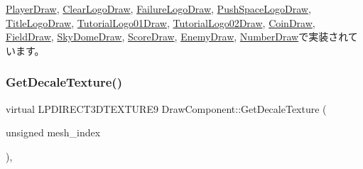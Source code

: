 \mbox{\hyperlink{class_player_draw_a1d58f14658bf5e058f67c6754d9898e7}{Player\+Draw}}, \mbox{\hyperlink{class_clear_logo_draw_ad3501ec3720bf2f2878de2785432eee7}{Clear\+Logo\+Draw}}, \mbox{\hyperlink{class_failure_logo_draw_a9e594c09e4da69134e9f7384cc5f8392}{Failure\+Logo\+Draw}}, \mbox{\hyperlink{class_push_space_logo_draw_a4d0e48e3770a3906bd7d0a607e36a5b5}{Push\+Space\+Logo\+Draw}}, \mbox{\hyperlink{class_title_logo_draw_a06917439520efba7319f254566f19b81}{Title\+Logo\+Draw}}, \mbox{\hyperlink{class_tutorial_logo01_draw_a92e3c7b5fb5e068615418299c0ab2b8b}{Tutorial\+Logo01\+Draw}}, \mbox{\hyperlink{class_tutorial_logo02_draw_a616cd2a60e7bc628bfa7845f4cefaa0a}{Tutorial\+Logo02\+Draw}}, \mbox{\hyperlink{class_coin_draw_a57e3f327324db9ec3debc702d14325c7}{Coin\+Draw}}, \mbox{\hyperlink{class_field_draw_a78b6bc16f825e91c39fad97931ea63fd}{Field\+Draw}}, \mbox{\hyperlink{class_sky_dome_draw_a89a1d08932cb19b43ebe42481944b6cc}{Sky\+Dome\+Draw}}, \mbox{\hyperlink{class_score_draw_a0744dd3db298a45683b7521a02e8e9db}{Score\+Draw}}, \mbox{\hyperlink{class_enemy_draw_a4d922df05a3a3f4117399817c24554e6}{Enemy\+Draw}}, \mbox{\hyperlink{class_number_draw_a8ff9515eb359a04517d7d36321fff0d7}{Number\+Draw}}で実装されています。

\mbox{\label{class_draw_component_a9ea98f4bcdfd76782d5234122b132c3d}} 
\subsubsection{\texorpdfstring{Get\+Decale\+Texture()}{GetDecaleTexture()}}
{\footnotesize\ttfamily virtual L\+P\+D\+I\+R\+E\+C\+T3\+D\+T\+E\+X\+T\+U\+R\+E9 Draw\+Component\+::\+Get\+Decale\+Texture (\begin{DoxyParamCaption}\item[{unsigned}]{mesh\+\_\+index }\end{DoxyParamCaption})\hspace{0.3cm}{\ttfamily [inline]}, {\ttfamily [virtual]}}



